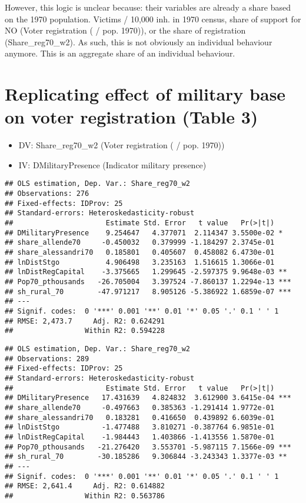 \documentclass[
]{article}
\providecommand{\tightlist}{%
  \setlength{\itemsep}{0pt}\setlength{\parskip}{0pt}}
\begin{document}
However, this logic is unclear because: their variables are already a
share based on the 1970 population. Victims / 10,000 inh. in 1970
census, share of support for NO (Voter registration ( / pop. 1970)), or
the share of registration (Share\_reg70\_w2). As such, this is not
obviously an individual behaviour anymore. This is an aggregate share of
an individual behaviour.

\hypertarget{replicating-effect-of-military-base-on-voter-registration-table-3}{%
\section{Replicating effect of military base on voter registration
(Table
3)}\label{replicating-effect-of-military-base-on-voter-registration-table-3}}

\begin{itemize}
\tightlist
\item
  DV: Share\_reg70\_w2 (Voter registration ( / pop. 1970))
\item
  IV: DMilitaryPresence (Indicator military presence)
\end{itemize}

\begin{verbatim}
## OLS estimation, Dep. Var.: Share_reg70_w2
## Observations: 276 
## Fixed-effects: IDProv: 25
## Standard-errors: Heteroskedasticity-robust 
##                      Estimate Std. Error   t value   Pr(>|t|)    
## DMilitaryPresence    9.254647   4.377071  2.114347 3.5500e-02 *  
## share_allende70     -0.450032   0.379999 -1.184297 2.3745e-01    
## share_alessandri70   0.185801   0.405607  0.458082 6.4730e-01    
## lnDistStgo           4.906498   3.235163  1.516615 1.3066e-01    
## lnDistRegCapital    -3.375665   1.299645 -2.597375 9.9648e-03 ** 
## Pop70_pthousands   -26.705004   3.397524 -7.860137 1.2294e-13 ***
## sh_rural_70        -47.971217   8.905126 -5.386922 1.6859e-07 ***
## ---
## Signif. codes:  0 '***' 0.001 '**' 0.01 '*' 0.05 '.' 0.1 ' ' 1
## RMSE: 2,473.7     Adj. R2: 0.624291
##                 Within R2: 0.594228
\end{verbatim}

\begin{verbatim}
## OLS estimation, Dep. Var.: Share_reg70_w2
## Observations: 289 
## Fixed-effects: IDProv: 25
## Standard-errors: Heteroskedasticity-robust 
##                      Estimate Std. Error   t value   Pr(>|t|)    
## DMilitaryPresence   17.431639   4.824832  3.612900 3.6415e-04 ***
## share_allende70     -0.497663   0.385363 -1.291414 1.9772e-01    
## share_alessandri70   0.183281   0.416650  0.439892 6.6039e-01    
## lnDistStgo          -1.477488   3.810271 -0.387764 6.9851e-01    
## lnDistRegCapital    -1.984443   1.403866 -1.413556 1.5870e-01    
## Pop70_pthousands   -21.276420   3.553701 -5.987115 7.1566e-09 ***
## sh_rural_70        -30.185286   9.306844 -3.243343 1.3377e-03 ** 
## ---
## Signif. codes:  0 '***' 0.001 '**' 0.01 '*' 0.05 '.' 0.1 ' ' 1
## RMSE: 2,641.4     Adj. R2: 0.614882
##                 Within R2: 0.563786
\end{verbatim}
\end{document}
